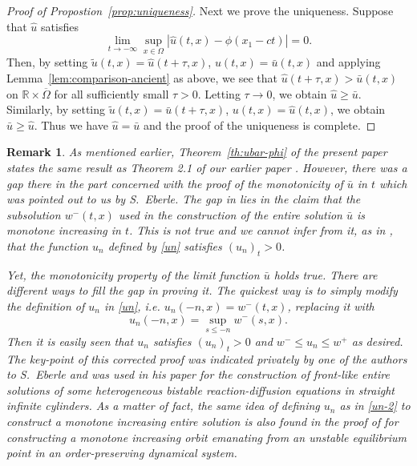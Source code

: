 \documentclass[a4paper,12pt,fullpage]{article}
\numberwithin{equation}{section}
\newtheorem{Rk}[Lemma]{Remark}
\def\R{{\mathbb R}}
\begin{document}
\begin{proof}[Proof of Propostion~\ref{prop:uniqueness}]
Next we prove the uniqueness. Suppose that $\widehat{u}$ satisfies 
\[
\lim_{t\to-\infty}\sup_{x\in\Omega} |\widehat{u}(t,x)-\phi(x_1-ct)|=0. 
\]
Then, by setting $\widetilde{u}(t,x)=\widehat{u}(t+\tau,x)$, $u(t,x)=\bar{u}(t,x)$ and applying Lemma~\ref{lem:comparison-ancient} as above, we see that $\widehat{u}(t+\tau,x)>\bar{u}(t,x)$ on $\R\times\overline{\Omega}$ for all sufficiently small $\tau>0$. Letting $\tau\to 0$, we obtain $\widehat{u}\geq \bar{u}$. Similarly, by setting $\widetilde{u}(t,x)=\bar{u}(t+\tau,x)$, $u(t,x)=\widehat{u}(t,x)$, we obtain $\bar{u}\geq\widehat{u}$. Thus we have $\widehat{u}=\bar{u}$ and the proof of the uniqueness is complete.
\end{proof}

\begin{Rk}
\label{rk:historical}
As mentioned earlier,
Theorem~\ref{th:ubar-phi} of the present paper states the same result as Theorem 2.1 of our earlier paper \cite{BHM1}. However, there was a gap there in the part concerned with the proof of the monotonicity of $\bar{u}$ in $t$ which was pointed out to us by S.~Eberle. The gap in \cite{BHM1} lies in the  claim that the subsolution $w^-(t,x)$ used in the construction of the entire solution $\bar{u}$ is monotone increasing in $t$. This is not true and we cannot infer from it, as in \cite{BHM1}, that the function $u_n$ defined by \eqref{un} satisfies $(u_n)_t>0$.

Yet, the monotonicity property of the limit function $\bar{u}$ holds true. There are different ways to fill the gap in proving it. The quickest way is to simply modify the definition of $u_n$ in \eqref{un}, i.e. $u_n(-n,x)=w^-(t,x)$, replacing it with
\begin{equation}\label{un-2}
u_n(-n,x)=\sup_{s\leq -n} w^-(s,x).
\end{equation}
Then it is easily seen that $u_n$ satisfies $(u_n)_t>0$ and $w^-\leq u_n\leq w^+$ as desired. The key-point of this corrected proof was indicated privately by one of the authors to S.~Eberle and was used in his paper \cite{E} for the construction of front-like entire solutions of some heterogeneous bistable reaction-diffusion equations in straight infinite cylinders. As a matter of fact, the same idea of defining $u_n$ as in \eqref{un-2} to construct a monotone increasing entire solution is also found in the proof of \cite[Theorem 5]{M1} for constructing a monotone increasing orbit emanating from an unstable equilibrium point in an order-preserving dynamical system. 


\end{Rk}
\end{document}
